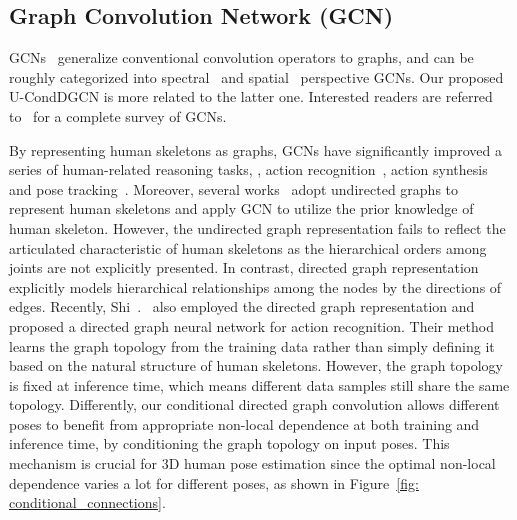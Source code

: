 \documentclass[sigconf]{acmart}
\begin{document}
\vspace{-3.5mm}
\subsection{Graph Convolution Network (GCN)}

GCNs~\cite{scarselli2008graph,cnn_graph,gilmer2017neural} generalize conventional convolution operators to graphs, and can be roughly categorized into spectral~\cite{cnn_graph,li2018adaptive,levie2018cayleynets} and spatial~\cite{duvenaud2015convolutional,atwood2016diffusion,gilmer2017neural} perspective GCNs.
Our proposed U-CondDGCN is more related to the latter one.
Interested readers are referred to~\cite{wu2020comprehensive} for a complete survey of GCNs.


By representing human skeletons as graphs, GCNs have significantly improved a series of human-related reasoning tasks, \eg, action recognition~\cite{yan2018spatial,shi2019two,shi2019skeleton}, action synthesis~\cite{yan2019convolutional} and pose tracking~\cite{ning2020lighttrack}.
Moreover, several works~\cite{cai2019exploiting,wang2020motion,zou2020high,liu2020comprehensive,zhao2019semantic} adopt undirected graphs to represent human skeletons and apply GCN to utilize the prior knowledge of human skeleton.
However, the undirected graph representation fails to reflect the articulated characteristic of human skeletons as the hierarchical orders among joints are not explicitly presented.
In contrast, directed graph representation explicitly models hierarchical relationships among the nodes by the directions of edges.
Recently, Shi~\etal.~\cite{shi2019skeleton} also employed the directed graph representation and proposed a directed graph neural network for action recognition.
Their method learns the graph topology from the training data rather than simply defining it based on the natural structure of human skeletons.
However, the graph topology is fixed at inference time, which means different data samples still share the same topology.
Differently, our conditional directed graph convolution allows different poses to benefit from appropriate non-local dependence at both training and inference time, by conditioning the graph topology on input poses.
This mechanism is crucial for 3D human pose estimation since the optimal non-local dependence varies a lot for different poses, as shown in Figure~\ref{fig: conditional_connections}.
\end{document}
